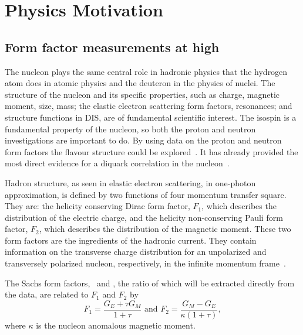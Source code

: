%
\section{Physics Motivation}
\label{sec:sec2}
\subsection{Form factor measurements at high \qsq}
\indent
The nucleon plays the same central role in hadronic physics that the hydrogen atom does in atomic physics and the deuteron in the physics of nuclei.
The structure of the nucleon and its specific properties, such as charge, magnetic moment, size, mass; the elastic electron scattering form factors, resonances; and structure functions in DIS, are of fundamental scientific interest.
The isospin is a fundamental property of the nucleon, so both the proton and neutron investigations are important to do.
By using data on the proton and neutron form factors the flavour structure could be explored~\cite{Cates:2011pz}.
It has already provided the most direct evidence for a diquark correlation in the nucleon~\cite{Roberts:2007jh, Segovia:2014aza, Wojtsekhowski:2020tlo}.

Hadron structure, as seen in elastic electron scattering, in one-photon approximation, is defined by two functions of four momentum transfer square.
They are: the helicity conserving Dirac form factor, $F_1$, which describes the distribution of the electric charge, and the helicity non-conserving Pauli form factor, $F_2$, which describes the distribution of the magnetic moment.
These two form factors are the ingredients of the hadronic current.  
They contain information on the transverse charge distribution for an unpolarized and transversely polarized nucleon, respectively, 
in the infinite momentum frame~\cite{Miller:2007uy, Carlson:2007xd}.

The Sachs form factors, \gef~and \gmf, the ratio of which will be extracted directly from the data, are related to $F_1$ and $F_2$ by
%
\begin{equation}
F_{1} = \frac{G_{E} + \tau G_{M}}{1+\tau} \mbox{  and  }
F_{2} = \frac{G_{M} - G_{E}}{\kappa (1+\tau)},
\label{eq:f1f2}
\end{equation}
%
where $\kappa$ is the nucleon anomalous magnetic moment.

